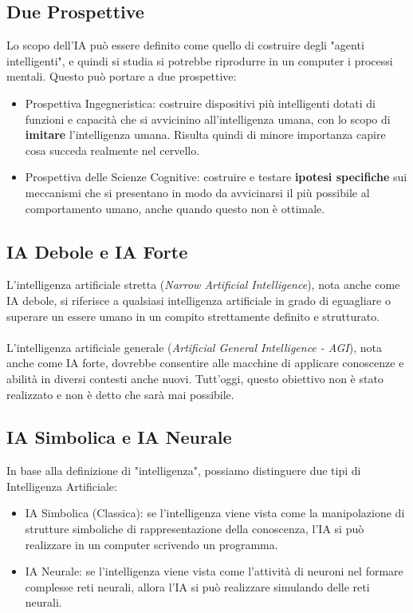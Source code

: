 \documentclass[12pt, a4paper]{article}
\begin{document}
\subsection{Due Prospettive}
Lo scopo dell'IA può essere definito come quello di costruire degli "agenti intelligenti", e quindi si studia si potrebbe riprodurre in un computer i processi mentali. Questo può portare a due prospettive:
\begin{itemize}
    \item Prospettiva Ingegneristica: costruire dispositivi più intelligenti dotati di funzioni e capacità che si avvicinino all'intelligenza umana, con lo scopo di \textbf{imitare} l'intelligenza umana. Risulta quindi di minore importanza capire cosa succeda realmente nel cervello.
    \item Prospettiva delle Scienze Cognitive: costruire e testare \textbf{ipotesi specifiche} sui meccanismi che si presentano in modo da avvicinarsi il più possibile al comportamento umano, anche quando questo non è ottimale.
\end{itemize}

\subsection{IA Debole e IA Forte}
L'intelligenza artificiale stretta (\textit{Narrow Artificial Intelligence}), nota anche come IA debole, si riferisce a qualsiasi intelligenza artificiale in grado di eguagliare o superare un essere umano in un compito strettamente definito e strutturato.\\\\
L'intelligenza artificiale generale (\textit{Artificial General Intelligence - AGI}), nota anche come IA forte, dovrebbe consentire alle macchine di applicare conoscenze e abilità in diversi contesti anche nuovi. Tutt'oggi, questo obiettivo non è stato realizzato e non è detto che sarà mai possibile.

\subsection{IA Simbolica e IA Neurale}
In base alla definizione di "intelligenza", possiamo distinguere due tipi di Intelligenza Artificiale:
\begin{itemize}
    \item IA Simbolica (Classica): se l'intelligenza viene vista come la manipolazione di strutture simboliche di rappresentazione della conoscenza, l'IA  si può realizzare in un computer scrivendo un programma.
    \item IA Neurale: se l'intelligenza viene vista come l'attività di neuroni nel formare complesse reti neurali, allora l'IA si può realizzare simulando delle reti neurali.
\end{itemize}
\end{document}
